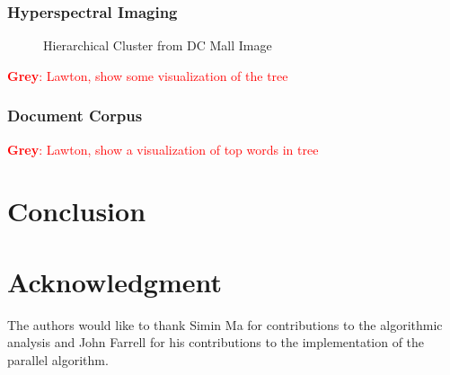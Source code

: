 \documentclass[conference,compsoc]{IEEEtran}
\newcommand{\GB}[1]{\textcolor{red}{\textbf{Grey}: #1}}
\begin{document}
\subsubsection{Hyperspectral Imaging}
\begin{figure}

\caption{Hierarchical Cluster from DC Mall Image}
\label{fig:dc}
\end{figure}

\GB{Lawton, show some visualization of the tree}

\subsubsection{Document Corpus}

\GB{Lawton, show a visualization of top words in tree}

\section{Conclusion}

\section*{Acknowledgment}

The authors would like to thank Simin Ma for contributions to the algorithmic analysis and John Farrell for his contributions to the implementation of the parallel algorithm.



\end{document}
